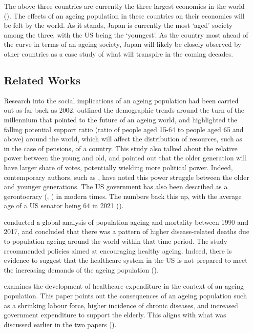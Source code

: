 \documentclass[11pt]{article}
\begin{document}
The above three countries are currently the three largest economies in the world (\cite{worldbankgdp}). The effects of an ageing population in these countries on their economies will be felt by the world. As it stands, Japan is currently the most `aged' society among the three, with the US being the `youngest'. As the country most ahead of the curve in terms of an ageing society, Japan will likely be closely observed by other countries as a case study of what will transpire in the coming decades.


\subsection*{Related Works}
Research into the social implications of an ageing population had been carried out as far back as 2002. \cite{tinker2002social} outlined the demographic trends around the turn of the millennium that pointed to the future of an ageing world, and highlighted the falling potential support ratio (ratio of people aged 15-64 to people aged 65 and above) around the world, which will affect the distribution of resources, such as in the case of pensions, of a country. This study also talked about the relative power between the young and old, and pointed out that the older generation will have larger share of votes, potentially wielding more political power. Indeed, contemporary authors, such as \cite{Munger+2022}, have noted this power struggle between the older and younger generations. The US government has also been described as a gerontocracy (\cite{noah_2019}, \cite{thompson_2020}) in modern times. The numbers back this up, with the average age of a US senator being 64 in 2021 (\cite{manning_2022}).

\cite{Cheng2020} conducted a global analysis of population ageing and mortality between 1990 and 2017, and concluded that there was a pattern of higher disease-related deaths due to population ageing around the world within that time period. The study recommended policies aimed at encouraging healthy ageing. Indeed, there is evidence to suggest that the healthcare system in the US is not prepared to meet the increasing demands of the ageing population (\cite{foley_retooling_2020}).

\cite{marevsova2015economics} examines the development of healthcare expenditure in the context of an ageing population. This paper points out the consequences of an ageing population such as a shrinking labour force, higher incidence of chronic diseases, and increased government expenditure to support the elderly. This aligns with what was discussed earlier in the two papers (\cite{tinker2002social,Cheng2020}).
\end{document}
